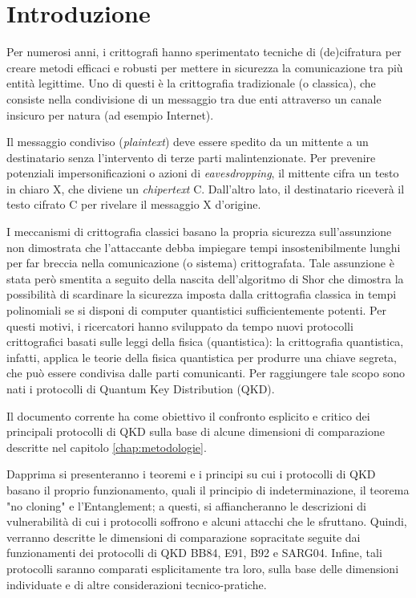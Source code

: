 \chapter{Introduzione}
\label{chap:Introduzione}

Per numerosi anni, i crittografi hanno sperimentato tecniche di (de)cifratura per creare metodi efficaci e robusti per mettere in sicurezza la comunicazione tra più entità legittime. Uno di questi è la crittografia tradizionale (o classica), che consiste nella condivisione di un messaggio tra due enti attraverso un canale insicuro per natura (ad esempio Internet).

Il messaggio condiviso (\textit{plaintext}) deve essere spedito da un mittente a un destinatario senza l'intervento di terze parti malintenzionate. Per prevenire potenziali impersonificazioni o azioni di \textit{eavesdropping}, il mittente cifra un testo in chiaro X, che diviene un \textit{chipertext} C. Dall'altro lato, il destinatario riceverà il testo cifrato C per rivelare il messaggio X d'origine.

I meccanismi di crittografia classici basano la propria sicurezza sull'assunzione non dimostrata che l'attaccante debba impiegare tempi insostenibilmente lunghi per far breccia nella comunicazione (o sistema) crittografata. Tale assunzione è stata però smentita a seguito della nascita dell'algoritmo di Shor \cite{algo_shor} che dimostra la possibilità di scardinare la sicurezza imposta dalla crittografia classica in tempi polinomiali se si disponi di computer quantistici sufficientemente potenti. Per questi motivi, i ricercatori hanno sviluppato da tempo nuovi protocolli crittografici basati sulle leggi della fisica (quantistica): la crittografia quantistica, infatti, applica le teorie della fisica quantistica per produrre una chiave segreta, che può essere condivisa dalle parti comunicanti. Per raggiungere tale scopo sono nati i protocolli di Quantum Key Distribution (QKD).

Il documento corrente ha come obiettivo il confronto esplicito e critico dei principali protocolli di QKD sulla base di alcune dimensioni di comparazione descritte nel capitolo \ref{chap:metodologie}.

Dapprima si presenteranno i teoremi e i principi su cui i protocolli di QKD basano il proprio funzionamento, quali il principio di indeterminazione, il teorema "no cloning" e l'Entanglement; a questi, si affiancheranno le descrizioni di vulnerabilità di cui i protocolli soffrono e alcuni attacchi che le sfruttano. Quindi, verranno descritte le dimensioni di comparazione sopracitate seguite dai funzionamenti dei protocolli di QKD BB84, E91, B92 e SARG04. Infine, tali protocolli saranno comparati esplicitamente tra loro, sulla base delle dimensioni individuate e di altre considerazioni tecnico-pratiche.